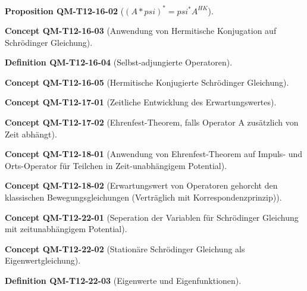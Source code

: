 \documentclass[10pt, letterpaper]{article}
\newcommand{\CustomHeading}[3]{%
  \par\medskip\noindent%
  \textbf{#1 #2} \textnormal{(#3)}.\enskip%
}
\newenvironment{DEF}[2]{\CustomHeading{Definition}{#1}{#2}}{}
\newenvironment{PROP}[2]{\CustomHeading{Proposition}{#1}{#2}}{}
\newenvironment{CONC}[2]{\CustomHeading{Concept}{#1}{#2}}{}
\begin{document}
\begin{PROP}{QM-T12-16-02}{$(A*psi)^*=psi^*A^{HK}$}
\end{PROP}

\begin{CONC}{QM-T12-16-03}{Anwendung von Hermitische Konjugation auf Schrödinger Gleichung}
\end{CONC}

\begin{DEF}{QM-T12-16-04}{Selbst-adjungierte Operatoren}
\end{DEF}

\begin{CONC}{QM-T12-16-05}{Hermitische Konjugierte Schrödinger Gleichung}
\end{CONC}

\begin{CONC}{QM-T12-17-01}{Zeitliche Entwicklung des Erwartungswertes}
\end{CONC}

\begin{CONC}{QM-T12-17-02}{Ehrenfest-Theorem, falls Operator A zusätzlich von Zeit abhängt}
\end{CONC}

\begin{CONC}{QM-T12-18-01}{Anwendung von Ehrenfest-Theorem auf Impuls- und Orts-Operator für Teilchen in Zeit-unabhängigem Potential}
\end{CONC}

\begin{CONC}{QM-T12-18-02}{Erwartungswert von Operatoren gehorcht den klassischen Bewegungsgleichungen (Verträglich mit Korrespondenzprinzip)}
\end{CONC}

\begin{CONC}{QM-T12-22-01}{Seperation der Variablen für Schrödinger Gleichung mit zeitunabhängigem Potential}
\end{CONC}

\begin{CONC}{QM-T12-22-02}{Stationäre Schrödinger Gleichung als Eigenwertgleichung}
\end{CONC}

\begin{DEF}{QM-T12-22-03}{Eigenwerte und Eigenfunktionen}
\end{DEF}
\end{document}
